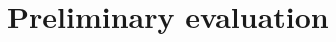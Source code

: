\documentclass[12pt]{article}
\begin{document}











\section{Preliminary evaluation}
\end{document}

